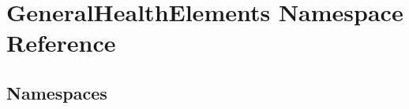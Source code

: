 \hypertarget{namespace_general_health_elements}{}\section{General\+Health\+Elements Namespace Reference}
\label{namespace_general_health_elements}
\subsection*{Namespaces}
\begin{DoxyCompactItemize}
\end{DoxyCompactItemize}

